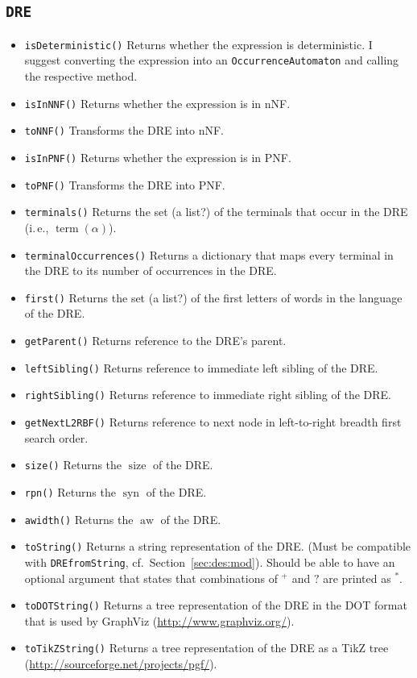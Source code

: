 \documentclass[a4paper,11pt, svgnames,titlepage]{article}
\newcommand{\rxp}{{^\mathtt{+}}}
\newcommand{\rxs}{{^\mathtt{*}}}
\newcommand{\rxo}{\mathtt{?}}
\DeclareMathOperator{\siz}{size}
\DeclareMathOperator{\syn}{syn}
\DeclareMathOperator{\aw}{aw}
\DeclareMathOperator{\term}{term}
\begin{document}
\subsection{\texttt{DRE}}\label{sec:des:dre}
\begin{itemize}
	\item\texttt{isDeterministic()} Returns whether the expression is deterministic. I suggest converting the expression into an \texttt{OccurrenceAutomaton} and calling the respective method.
	\item\texttt{isInNNF()} Returns whether the expression is in nNF.
	\item\texttt{toNNF()} Transforms the DRE into nNF.
	\item\texttt{isInPNF()} Returns whether the expression is in PNF.
	\item\texttt{toPNF()} Transforms the DRE into PNF.
	\item\texttt{terminals()} Returns the set (a list?) of the terminals that occur in the DRE (i.\,e., $\term(\alpha)$).
	\item\texttt{terminalOccurrences()} Returns a dictionary that maps every terminal in the DRE to its number of occurrences in the DRE.
	\item\texttt{first()} Returns the set (a list?) of the first letters of words in the language of the DRE.
	\item\texttt{getParent()} Returns reference to the DRE's parent.
	\item\texttt{leftSibling()} Returns reference to immediate left sibling of the DRE.
	\item\texttt{rightSibling()} Returns reference to immediate right sibling of the DRE.
	\item\texttt{getNextL2RBF()} Returns reference to next node in left-to-right breadth first search order.
	\item\texttt{size()} Returns the $\siz$ of the DRE.
	\item\texttt{rpn()} Returns the $\syn$ of the DRE.
	\item\texttt{awidth()} Returns the $\aw$ of the DRE.
	\item\texttt{toString()} Returns a string representation of the DRE. (Must be compatible with \texttt{DREfromString}, cf.\ Section~\ref{sec:des:mod}). Should be able to have an optional argument that states that combinations of $\rxp$ and $\rxo$ are printed as $\rxs$.
	\item\texttt{toDOTString()} Returns a tree representation of the DRE in the DOT format that is used by GraphViz (\url{http://www.graphviz.org/}).
	\item\texttt{toTikZString()} Returns a tree representation of the DRE as a TikZ tree (\url{http://sourceforge.net/projects/pgf/}).
\end{itemize}
\end{document}
